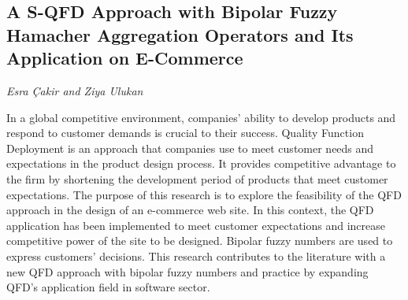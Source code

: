 \documentclass[../booklet.tex]{subfiles}
\begin{document}
\subsection[A S-QFD Approach with Bipolar Fuzzy Hamacher Aggregation Operators and Its Application on E-Commerce. {\it Esra Çakir and Ziya Ulukan}]{A S-QFD Approach with Bipolar Fuzzy Hamacher Aggregation Operators and Its Application on E-Commerce}
 

\begin{center}
  {\it Esra Çakir and Ziya Ulukan}
\end{center}


In a global competitive environment, companies' ability to develop products and respond to customer demands is crucial to their success. Quality Function Deployment is an approach that companies use to meet customer needs and expectations in the product design process. It provides competitive advantage to the firm by shortening the development period of products that meet customer expectations. The purpose of this research is to explore the feasibility of the QFD approach in the design of an e-commerce web site. In this context, the QFD application has been implemented to meet customer expectations and increase competitive power of the site to be designed. Bipolar fuzzy numbers are used to express customers' decisions. This research contributes to the literature with a new QFD approach with bipolar fuzzy numbers and practice by expanding QFD's application field in software sector.
\end{document}
